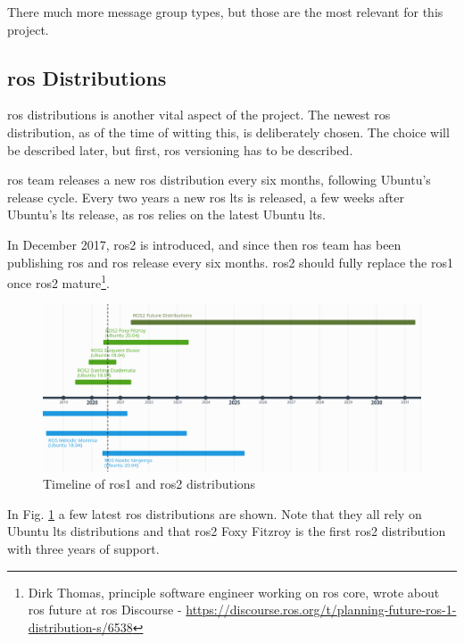 There much more message group types, but those are the most relevant for this project.

\subsection{\ac{ros} Distributions}

\ac{ros} distributions is another vital aspect of the project. The newest \ac{ros} distribution, as of the time of witting this, is deliberately chosen. The choice will be described later, but first, \ac{ros} versioning has to be described.

\ac{ros} team releases a new \ac{ros} distribution every six months, following Ubuntu's release cycle. Every two years a new \ac{ros} \ac{lts} is released, a few weeks after Ubuntu's \ac{lts} release, as \ac{ros} relies on the latest Ubuntu \ac{lts}.

In December 2017, \ac{ros2} is introduced, and since then \ac{ros} team has been publishing \ac{ros} and \ac{ros} release every six months. \ac{ros2} should fully replace the  \ac{ros}1 once \ac{ros2} mature\footnote{Dirk Thomas, principle software engineer working on \ac{ros} core, wrote about \ac{ros} future at \ac{ros} Discourse -  \url{https://discourse.ros.org/t/planning-future-ros-1-distribution-s/6538}}.

\begin{figure}[H]
    \centering
    \includegraphics[width=\textwidth]{background/figures/ros_distributions.png}
    \caption{Timeline of \ac{ros}1 and \ac{ros2} distributions}
    \label{fig:background:ros_distributions}
\end{figure}

In Fig. \ref{fig:background:ros_distributions} a few latest \ac{ros} distributions are shown. Note that they all rely on Ubuntu \ac{lts} distributions and that \ac{ros2} Foxy Fitzroy is the first \ac{ros2} distribution with three years of support.

